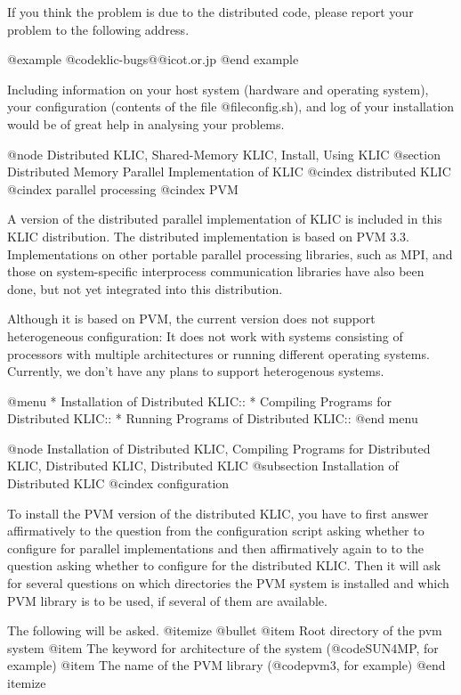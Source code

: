 {{{{If you think the problem is due to the distributed code, please report
your problem to the following address.

@example
@code{klic-bugs@@icot.or.jp}
@end example

Including information on your host system (hardware and operating
system), your configuration (contents of the file @file{config.sh}), and
log of your installation would be of great help in analysing your
problems.

@node Distributed KLIC, Shared-Memory KLIC, Install, Using KLIC
@section Distributed Memory Parallel Implementation of KLIC
@cindex distributed KLIC
@cindex parallel processing
@cindex PVM

A version of the distributed parallel implementation of KLIC is included
in this KLIC distribution.  The distributed implementation is based on
PVM 3.3.  Implementations on other portable parallel processing
libraries, such as MPI, and those on system-specific interprocess
communication libraries have also been done, but not yet integrated into
this distribution.

Although it is based on PVM, the current version does not support
heterogeneous configuration: It does not work with systems consisting of
processors with multiple architectures or running different operating
systems.  Currently, we don't have any plans to support heterogenous
systems.

@menu
* Installation of Distributed KLIC::  
* Compiling Programs for Distributed KLIC::  
* Running Programs of Distributed KLIC::  
@end menu

@node Installation of Distributed KLIC, Compiling Programs for Distributed KLIC, Distributed KLIC, Distributed KLIC
@subsection Installation of Distributed KLIC
@cindex configuration

To install the PVM version of the distributed KLIC, you have to first
answer affirmatively to the question from the configuration script
asking whether to configure for parallel implementations and then
affirmatively again to to the question asking whether to configure for
the distributed KLIC.  Then it will ask for several questions on which
directories the PVM system is installed and which PVM library is to be
used, if several of them are available.

The following will be asked.
@itemize @bullet
@item
Root directory of the pvm system
@item
The keyword for architecture of the system (@code{SUN4MP}, for example)
@item
The name of the PVM library (@code{pvm3}, for example)
@end itemize

}}}}
